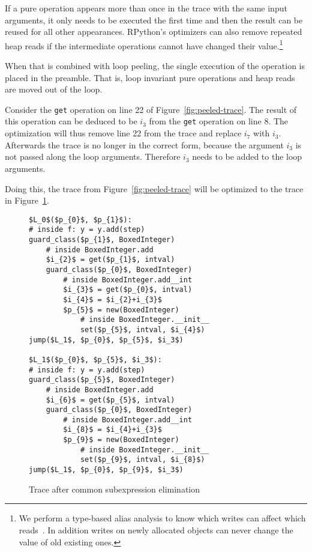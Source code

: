 \documentclass[preprint]{sigplanconf}
\let\oldcite=\cite
\renewcommand\cite[1]{\ifthenelse{\equal{#1}{XXX}}{[citation~needed]}{\oldcite{#1}}}
\begin{document}
If a pure operation appears more than once in the trace with the same input
arguments, it only needs to be executed the first time and then the result
can be reused for all other appearances. RPython's optimizers can also remove
repeated heap reads if the intermediate operations cannot have changed their
value.\footnote{We perform a type-based alias analysis to know which
writes can affect which reads~\cite{diwan_type-based_1998}. In addition writes
on newly allocated objects can never change the value of old existing ones.}

When that is combined with loop peeling, the single execution of the operation
is placed in the preamble. That is, loop invariant pure operations and heap
reads are moved out of the loop. 

Consider the \lstinline{get} operation on line 22 of
Figure~\ref{fig:peeled-trace}. The result of this operation can be
deduced to be $i_3$ from the \lstinline{get} operation on line
8. The optimization will thus remove line 22 from the trace and
replace $i_7$ with $i_3$. Afterwards the trace is no longer in the correct
form, because the argument $i_3$ is not passed along the loop arguments.
Therefore $i_3$ needs to be added to the loop arguments.

Doing this, the trace from Figure~\ref{fig:peeled-trace} will be optimized to
the trace in Figure~\ref{fig:cse-trace}.

\begin{figure}
\begin{lstlisting}[mathescape,numbers = right,basicstyle=\setstretch{1.05}\ttfamily\scriptsize]
$L_0$($p_{0}$, $p_{1}$):
# inside f: y = y.add(step)
guard_class($p_{1}$, BoxedInteger)
    # inside BoxedInteger.add
    $i_{2}$ = get($p_{1}$, intval)
    guard_class($p_{0}$, BoxedInteger)
        # inside BoxedInteger.add__int
        $i_{3}$ = get($p_{0}$, intval)
        $i_{4}$ = $i_{2}+i_{3}$
        $p_{5}$ = new(BoxedInteger)
            # inside BoxedInteger.__init__
            set($p_{5}$, intval, $i_{4}$)
jump($L_1$, $p_{0}$, $p_{5}$, $i_3$)

$L_1$($p_{0}$, $p_{5}$, $i_3$):
# inside f: y = y.add(step)
guard_class($p_{5}$, BoxedInteger)
    # inside BoxedInteger.add
    $i_{6}$ = get($p_{5}$, intval)
    guard_class($p_{0}$, BoxedInteger)
        # inside BoxedInteger.add__int
        $i_{8}$ = $i_{4}+i_{3}$
        $p_{9}$ = new(BoxedInteger)
            # inside BoxedInteger.__init__
            set($p_{9}$, intval, $i_{8}$)
jump($L_1$, $p_{0}$, $p_{9}$, $i_3$)
\end{lstlisting}
\caption{Trace after common subexpression elimination}
\label{fig:cse-trace}
\end{figure}
\end{document}
